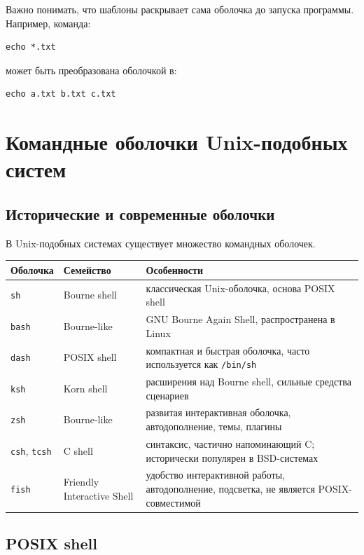 \documentclass[12pt,a4paper]{article}
\begin{document}
Важно понимать, что шаблоны раскрывает сама оболочка до запуска программы. Например, команда:

\begin{lstlisting}
echo *.txt
\end{lstlisting}

может быть преобразована оболочкой в:

\begin{lstlisting}
echo a.txt b.txt c.txt
\end{lstlisting}

\section{Командные оболочки Unix-подобных систем}

\subsection{Исторические и современные оболочки}

В Unix-подобных системах существует множество командных оболочек.

\begin{longtable}{|p{3cm}|p{4cm}|p{7cm}|}
\hline
Оболочка & Семейство & Особенности \\
\hline
\texttt{sh} & Bourne shell & классическая Unix-оболочка, основа POSIX shell \\
\hline
\texttt{bash} & Bourne-like & GNU Bourne Again Shell, распространена в Linux \\
\hline
\texttt{dash} & POSIX shell & компактная и быстрая оболочка, часто используется как \texttt{/bin/sh} \\
\hline
\texttt{ksh} & Korn shell & расширения над Bourne shell, сильные средства сценариев \\
\hline
\texttt{zsh} & Bourne-like & развитая интерактивная оболочка, автодополнение, темы, плагины \\
\hline
\texttt{csh}, \texttt{tcsh} & C shell & синтаксис, частично напоминающий C; исторически популярен в BSD-системах \\
\hline
\texttt{fish} & Friendly Interactive Shell & удобство интерактивной работы, автодополнение, подсветка, не является POSIX-совместимой \\
\hline
\end{longtable}

\subsection{POSIX shell}
\end{document}
